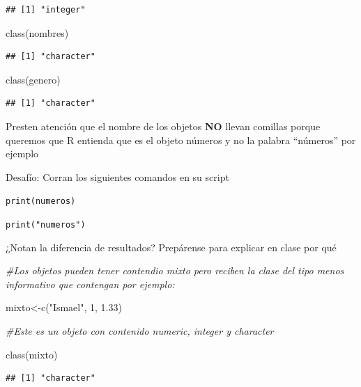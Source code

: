 \documentclass[
]{book}
\newenvironment{Shaded}{\begin{snugshade}}{\end{snugshade}}
\newcommand{\CommentTok}[1]{\textcolor[rgb]{0.56,0.35,0.01}{\textit{#1}}}
\newcommand{\DecValTok}[1]{\textcolor[rgb]{0.00,0.00,0.81}{#1}}
\newcommand{\FloatTok}[1]{\textcolor[rgb]{0.00,0.00,0.81}{#1}}
\newcommand{\FunctionTok}[1]{\textcolor[rgb]{0.00,0.00,0.00}{#1}}
\newcommand{\NormalTok}[1]{#1}
\newcommand{\OtherTok}[1]{\textcolor[rgb]{0.56,0.35,0.01}{#1}}
\newcommand{\StringTok}[1]{\textcolor[rgb]{0.31,0.60,0.02}{#1}}
\begin{document}
\begin{verbatim}
## [1] "integer"
\end{verbatim}

\begin{Shaded}
\begin{Highlighting}[]
\FunctionTok{class}\NormalTok{(nombres)}
\end{Highlighting}
\end{Shaded}

\begin{verbatim}
## [1] "character"
\end{verbatim}

\begin{Shaded}
\begin{Highlighting}[]
\FunctionTok{class}\NormalTok{(genero)}
\end{Highlighting}
\end{Shaded}

\begin{verbatim}
## [1] "character"
\end{verbatim}

Presten atención que el nombre de los objetos \textbf{NO} llevan comillas porque queremos que R entienda que es el objeto números y no la palabra ``números'' por ejemplo

Desafío:
Corran los siguientes comandos en su script

\texttt{print(numeros)}

\texttt{print("numeros")}

¿Notan la diferencia de resultados? Prepárense para explicar en clase por qué

\begin{Shaded}
\begin{Highlighting}[]
\CommentTok{\#Los objetos pueden tener contendio mixto pero reciben la clase del tipo menos informativo que contengan por ejemplo:}

\NormalTok{mixto}\OtherTok{\textless{}{-}}\FunctionTok{c}\NormalTok{(}\StringTok{"Ismael"}\NormalTok{, }\DecValTok{1}\NormalTok{, }\FloatTok{1.33}\NormalTok{)}

\CommentTok{\#Este es un objeto con contenido numeric, integer y character}

\FunctionTok{class}\NormalTok{(mixto)}
\end{Highlighting}
\end{Shaded}

\begin{verbatim}
## [1] "character"
\end{verbatim}
\end{document}
